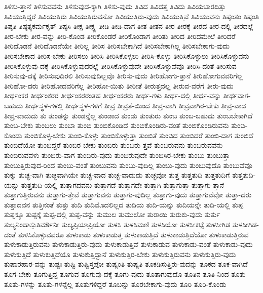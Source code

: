 {ತಿಳಿಸು-ತ್ತಾನೆ
ತಿಳಿಸುವವನು
ತಿಳಿಸುವುದ-ಕ್ಕಾಗಿ
ತಿಳಿಸು-ವುದು
ತಿವಿದ
ತಿವಿದತ್ತ
ತಿವಿದು
ತಿವಿಯಬಾರದಿತ್ತು
ತಿವಿಯುತ್ತಿದ್ದರೆ
ತಿವಿಯುತ್ತಿರು
ತಿವಿಯುತ್ತಿರುವನೋ
ತಿವಿಯುತ್ತಿರು-ವುದು
ತಿವಿಯುತ್ತಿವೆ
ತಿವಿಯುವನು
ತಿಷ್ಠಂತಂ
ತಿಷ್ಠಂತಿ
ತಿಷ್ಠತಿ
ತಿಷ್ಠತ್ಯಕರ್ಮಕೃತ್
ತಿಷ್ಠಸಿ
ತೀಕ್ಷ
ತೀಕ್ಷ್ಣ
ತೀಡಿ
ತೀಡಿ-ದಾಗ
ತೀತ
ತೀತನ
ತೀರ
ತೀರಕ್ಕೆ
ತೀರದ
ತೀರ-ದಲ್ಲಿ
ತೀರದಲ್ಲೆ
ತೀರ-ಬೇಕು
ತೀರ-ವನ್ನು
ತೀರಿ-ಕೊಂಡ
ತೀರಿಕೊಂಡರೆ
ತೀರಿಕೊಂಡಾಗ
ತೀರಿತು
ತೀರಿದ
ತೀರಿದಮೇಲೆ
ತೀರಿದರೆ
ತೀರಿದೊಡನೆ
ತೀರಿದೊಡನೆಯೇ
ತೀರಿಲ್ಲ
ತೀರಿಸ
ತೀರಿಸಬೇಕಾಗಿದೆ
ತೀರಿಸಬೇಕಾಗಿಲ್ಲ
ತೀರಿಸಬೇಕಾಗು-ವುದು
ತೀರಿಸಬೇಕಾದ
ತೀರಿಸ-ಬೇಕು
ತೀರಿಸಲು
ತೀರಿಸಿ
ತೀರಿಸಿಕೊಳ್ಳಲು
ತೀರಿಸಿ-ಕೊಳ್ಳು
ತೀರಿಸಿಕೊಳ್ಳುಲು
ತೀರಿಸಿಕೊಳ್ಳುವನು
ತೀರಿಸಿಕೊಳ್ಳುವು-ದಕ್ಕೆ
ತೀರಿಸಿಕೊಳ್ಳುವುದರಲ್ಲೆ
ತೀರಿಸಿಕೊಳ್ಳುವುದೇ
ತೀರಿಸಿಕೊಳ್ಳುವೆವೊ
ತೀರಿಸಿ-ದಂತೆ
ತೀರಿಸುವ
ತೀರಿಸುವು-ದಕ್ಕೆ
ತೀರಿಸುವುದಿರಲಿ
ತೀರಿಸುವುದಿಲ್ಲವೊ
ತೀರಿಸು-ವುದು
ತೀರಿಹೋಗು-ತ್ತಾನೆ
ತೀರಿಹೋಗುವವರಿಗೆಲ್ಲ
ತೀರಿಹೋ-ದರು
ತೀರಿಹೋದವರಿಗೆಲ್ಲ
ತೀರಿಹೋ-ಯಿತು
ತೀರೀತೆ
ತೀರುತ್ತದಲ್ಲ
ತೀರುವ-ವರೆಗೆ
ತೀರು-ವುದು
ತೀರ್ಥಂಕರ
ತೀರ್ಥಂಕರರ
ತೀರ್ಥಂಕರರಂತಹ
ತೀರ್ಥಂಕರರು
ತೀರ್ಥ-ಗಳು
ತೀರ್ಥ-ದಲ್ಲಿ
ತೀರ್ಥ-ವನ್ನು
ತೀರ್ಥವಾಗ-ಬಹುದು
ತೀರ್ಥಸ್ಥಳ-ಗಳಲ್ಲಿ
ತೀರ್ಥಸ್ಥಳ-ಗಳಿಗೆ
ತೀವ್ರ
ತೀವ್ರತೆ-ಯಿಂದ
ತೀವ್ರ-ವಾಗಿ
ತೀವ್ರವಾಗಿರ-ಬೇಕು
ತೀವ್ರ-ವಾದ
ತೀವ್ರ-ವಾದುದು
ತು
ತುಂಡನ್ನು
ತುಂಡನ್ನೆಲ್ಲ
ತುಂಡಾದ
ತುಂಡು
ತುಂತುರು
ತುಂಬ
ತುಂಬ-ಬಹುದು
ತುಂಬಬೇಕಾಗಿದೆ
ತುಂಬ-ಬೇಕು
ತುಂಬಲು
ತುಂಬಾ
ತುಂಬಿ
ತುಂಬಿಕೊಂಡಿದೆ
ತುಂಬಿಕೊಂಡಿರು-ವಂತೆ
ತುಂಬಿಕೊಂಡಿರುವನು
ತುಂಬಿ-ಕೊಂಡು
ತುಂಬಿಕೊಳ್ಳ-ಬೇಕು
ತುಂಬಿ-ಕೊಳ್ಳು
ತುಂಬಿಕೊಳ್ಳುತ್ತಾ
ತುಂಬಿತೆ
ತುಂಬಿದ
ತುಂಬಿದರೆ
ತುಂಬಿ-ದಾಗ
ತುಂಬಿದೆ
ತುಂಬಿದೆಯೋ
ತುಂಬಿದ್ದರೆ
ತುಂಬಿರ-ಬೇಕು
ತುಂಬಿರು
ತುಂಬಿರು-ತ್ತವೆ
ತುಂಬಿರುವನು
ತುಂಬಿರುವವನು
ತುಂಬಿರುವವಳು
ತುಂಬಿರು-ವಾಗ
ತುಂಬಿರು-ವುದು
ತುಂಬಿರುವುದೇ
ತುಂಬಿಸಿರ-ಬೇಕು
ತುಂಬು
ತುಂಬುತ್ತಾ
ತುಂಬುತ್ತಿರುವುದ-ರಿಂದ
ತುಂಬು-ವಂತೆ
ತುಂಬುವನು
ತುಂಬು-ವುದಿಲ್ಲ
ತುಂಬು-ವುದು
ತುಂಬುವುದೊ
ತುಂಬುವೆವೊ
ತುಕ್ಕು
ತುಚ್ಛ-ವಾಗಿ
ತುಚ್ಛವಾಗಿಯೇ
ತುಚ್ಛ-ವಾದ
ತುಚ್ಛ-ವಾದುದು
ತುಚ್ಛವೋ
ತುತ್ತ
ತುತ್ತತುದಿ
ತುತ್ತತುದಿಗೆ
ತುತ್ತತುದಿ-ಯನ್ನು
ತುತ್ತತುದಿ-ಯಲ್ಲಿ
ತುತ್ತಾಗದವನು
ತುತ್ತಾಗದೆ
ತುತ್ತಾಗದೇ
ತುತ್ತಾಗಿ
ತುತ್ತಾಗುತ್ತಾ
ತುತ್ತಾಗು-ತ್ತಾನೆ
ತುತ್ತಾಗುತ್ತಿರುವನು
ತುತ್ತಾಗು-ತ್ತೇವೆ
ತುತ್ತಾಗುವನು
ತುತ್ತಾಗು-ವುದಿಲ್ಲ
ತುತ್ತಾಗು-ವುದು
ತುತ್ತಾಗುವೆವೋ
ತುತ್ತಾ-ದರು
ತುತ್ತಾದವನ
ತುತ್ತಿನಂತೆ
ತುತ್ತು
ತುದಿ
ತುದಿಮೊದಲಿಲ್ಲದ
ತುದಿಯ
ತುದಿ-ಯನ್ನು
ತುದಿಯನ್ನೇ
ತುದಿ-ಯಲ್ಲಿ
ತುಪ್ಪ
ತುಪ್ಪಕ್ಕೂ
ತುಪ್ಪಕ್ಕೆ
ತುಪ್ಪ-ದಲ್ಲಿ
ತುಪ್ಪ-ವನ್ನು
ತುಮುಲ
ತುಮುಲೋ
ತುರಾಯಿ
ತುರುಕು-ವುದು
ತುರ್ತು
ತುಲ್ಯನಿಂದಾಸ್ತುತಿರ್ಮೌನೀ
ತುಲ್ಯಪ್ರಿಯಾಪ್ರಿಯೋ
ತುಳಸಿ
ತುಳಸಿಮಣಿ
ತುಳಸಿಯೋ
ತುಳಸೀಕಟ್ಟೆ
ತುಳಸೀಗಿಡ
ತುಳಸೀಗಿಡ-ದಂತೆ
ತುಳಿಸಿಕೊಳ್ಳುವವರೂ
ತುಳುಕಾಡು
ತುಳುಕಾಡುತ್ತ
ತುಳುಕಾಡುತ್ತಿದೆ
ತುಳುಕಾಡುತ್ತಿದೆಯೋ
ತುಳುಕಾಡುತ್ತಿರುವ
ತುಳುಕಾಡುತ್ತಿರುವನು
ತುಳುಕಾಡುತ್ತಿರು-ವುದು
ತುಳುಕಾಡುತ್ತಿವೆ
ತುಳುಕಾಡುವ
ತುಳುಕಾಡು-ವಂತೆ
ತುಳುಕಾಡು-ವುದು
ತುಳುಕುತ್ತಿದೆ
ತುಳುಕುತ್ತಿದೆಯೊ
ತುಳುಕುತ್ತಿದ್ದಾನೆ
ತುಳುಕುತ್ತಿರ-ಬೇಕು
ತುಳುಕುತ್ತಿರುವನು
ತುಳುಕುತ್ತಿರು-ವುದು
ತುಷಾರಹಾರ-ವನ್ನು
ತುಷ್ಟಃ
ತುಷ್ಟಿ
ತುಷ್ಟಿಸ್ತಪೋ
ತುಷ್ಯಂತಿ
ತುಷ್ಯತಿ
ತೂಕಡಿಸುತ್ತಿರು-ವುದನ್ನು
ತೂಕದ
ತೂಕ-ವಾಗಿದೆ
ತೂಗ-ಬೇಕು
ತೂಗುತ್ತಿದ್ದ
ತೂಗುವ
ತೂಗುವು-ದಕ್ಕೆ
ತೂಗು-ವುದು
ತೂತಾಗುವುದೊ
ತೂತಿನ
ತೂತಿ-ನಿಂದ
ತೂತು
ತೂತು-ಗಳನ್ನು
ತೂತು-ಗಳನ್ನೆಲ್ಲ
ತೂತುಗಳಿದ್ದರೆ
ತೂಬನ್ನು
ತೂರಬೇಕಾಗು-ವುದು
ತೂರಿ
ತೂರಿ-ಕೊಂಡು
}
